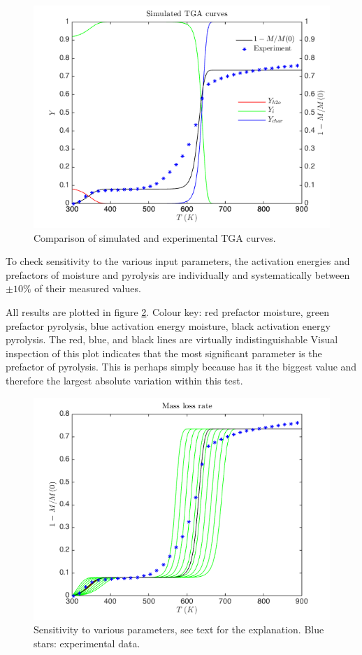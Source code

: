 \documentclass[reqno]{amsart}
\begin{document}
\begin{figure}
\centering
  \includegraphics[scale=0.5]{tga.png}
\caption{Comparison of simulated and experimental TGA curves.}
\label{fig:simulatedTGA}
\end{figure}

\clearpage
\newpage

To check sensitivity to the various input parameters, the activation energies and prefactors of moisture and pyrolysis are individually and systematically between $\pm 10\%$ of their measured values. 

All results are plotted in figure \ref{fig:sens}.
Colour key: red prefactor moisture, green prefactor pyrolysis, blue activation energy moisture, black activation energy pyrolysis. 
The red, blue, and black lines are virtually indistinguishable 
Visual inspection of this plot indicates that the most significant parameter is the prefactor of pyrolysis. 
This is perhaps simply because has it the biggest value and therefore the largest absolute variation within this test. 

\begin{figure}
\centering
  \includegraphics[scale=0.5]{sens.png}
\caption{Sensitivity to various parameters, see text for the explanation. Blue stars: experimental data.}
\label{fig:sens}
\end{figure}
\end{document}
